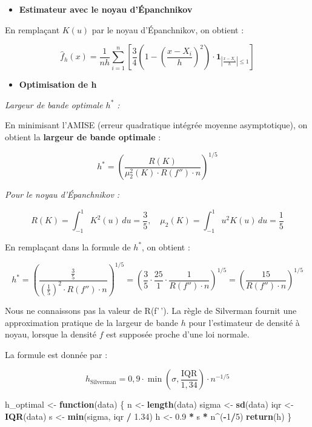 \documentclass[
  12pt,
]{article}
\newenvironment{Shaded}{\begin{snugshade}}{\end{snugshade}}
\newcommand{\ControlFlowTok}[1]{\textcolor[rgb]{0.13,0.29,0.53}{\textbf{#1}}}
\newcommand{\DecValTok}[1]{\textcolor[rgb]{0.00,0.00,0.81}{#1}}
\newcommand{\FloatTok}[1]{\textcolor[rgb]{0.00,0.00,0.81}{#1}}
\newcommand{\FunctionTok}[1]{\textcolor[rgb]{0.13,0.29,0.53}{\textbf{#1}}}
\newcommand{\NormalTok}[1]{#1}
\newcommand{\OtherTok}[1]{\textcolor[rgb]{0.56,0.35,0.01}{#1}}
\newcommand{\SpecialCharTok}[1]{\textcolor[rgb]{0.81,0.36,0.00}{\textbf{#1}}}
\providecommand{\tightlist}{%
  \setlength{\itemsep}{0pt}\setlength{\parskip}{0pt}}
\begin{document}
\begin{itemize}
\tightlist
\item
  \textbf{Estimateur avec le noyau d'Épanchnikov}
\end{itemize}

En remplaçant \(K(u)\) par le noyau d'Épanchnikov, on obtient :

\[
\hat{f}_h(x) = \frac{1}{n h} \sum_{i=1}^n \left[ \frac{3}{4} \left( 1 - \left( \frac{x - X_i}{h} \right)^2 \right) \cdot \mathbf{1}_{\left| \frac{x - X_i}{h} \right| \leq 1} \right]
\]

\begin{itemize}
\tightlist
\item
  \textbf{Optimisation de h}
\end{itemize}

\emph{Largeur de bande optimale \(h^*\) : }

En minimisant l'AMISE (erreur quadratique intégrée moyenne
asymptotique), on obtient la \textbf{largeur de bande optimale} :

\[
h^* = \left( \frac{R(K)}{ \mu_2^2(K) \cdot R(f'') \cdot n } \right)^{1/5}
\]

\emph{Pour le noyau d'Épanchnikov : }

\[
R(K) = \int_{-1}^1 K^2(u)\, du = \frac{3}{5}, \quad \mu_2(K) = \int_{-1}^1 u^2 K(u)\, du = \frac{1}{5}
\]

En remplaçant dans la formule de \(h^*\), on obtient :

\[
h^* = \left( \frac{\frac{3}{5}}{ \left( \frac{1}{5} \right)^2 \cdot R(f'') \cdot n } \right)^{1/5}
= \left( \frac{3}{5} \cdot \frac{25}{1} \cdot \frac{1}{R(f'') \cdot n} \right)^{1/5}
= \left( \frac{15}{R(f'') \cdot n} \right)^{1/5}
\]

Nous ne connaissons pas la valeur de R(f'\,'). La règle de Silverman
fournit une approximation pratique de la largeur de bande \(h\) pour
l'estimateur de densité à noyau, lorsque la densité \(f\) est supposée
proche d'une loi normale.

La formule est donnée par :

\[
h_{\text{Silverman}} = 0{,}9 \cdot \min\left( \sigma, \frac{\text{IQR}}{1{,}34} \right) \cdot n^{-1/5}
\]

\begin{Shaded}
\begin{Highlighting}[]
\NormalTok{h\_optimal }\OtherTok{\textless{}{-}} \ControlFlowTok{function}\NormalTok{(data) \{}
\NormalTok{  n }\OtherTok{\textless{}{-}} \FunctionTok{length}\NormalTok{(data)}
\NormalTok{  sigma }\OtherTok{\textless{}{-}} \FunctionTok{sd}\NormalTok{(data)}
\NormalTok{  iqr }\OtherTok{\textless{}{-}} \FunctionTok{IQR}\NormalTok{(data)}
\NormalTok{  s }\OtherTok{\textless{}{-}} \FunctionTok{min}\NormalTok{(sigma, iqr }\SpecialCharTok{/} \FloatTok{1.34}\NormalTok{)}
\NormalTok{  h }\OtherTok{\textless{}{-}} \FloatTok{0.9} \SpecialCharTok{*}\NormalTok{ s }\SpecialCharTok{*}\NormalTok{ n}\SpecialCharTok{\^{}}\NormalTok{(}\SpecialCharTok{{-}}\DecValTok{1}\SpecialCharTok{/}\DecValTok{5}\NormalTok{)}
  \FunctionTok{return}\NormalTok{(h)}
\NormalTok{\}}
\end{Highlighting}
\end{Shaded}
\end{document}

